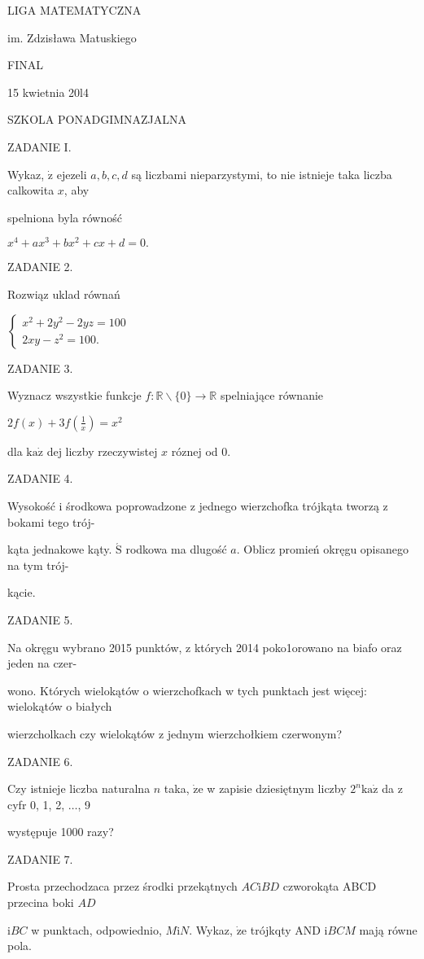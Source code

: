 \documentclass[a4paper,12pt]{article}
\begin{document}
LIGA MATEMATYCZNA

im. Zdzisława Matuskiego

FINAL

15 kwietnia 20l4

SZKOLA PONADGIMNAZJALNA

ZADANIE I.

Wykaz, $\dot{\mathrm{z}}$ ejezeli $a, b, c, d$ są liczbami nieparzystymi, to nie istnieje taka liczba calkowita $x$, aby

spelniona byla równość

$x^{4}+ax^{3}+bx^{2}+cx+d=0.$

ZADANIE 2.

Rozwiąz uklad równań

$\left\{\begin{array}{l}
x^{2}+2y^{2}-2yz=100\\
2xy-z^{2}=100.
\end{array}\right.$

ZADANIE 3.

Wyznacz wszystkie funkcje $f:\mathbb{R}\backslash \{0\}\rightarrow \mathbb{R}$ spelniające równanie

$2f(x)+3f(\displaystyle \frac{1}{x})=x^{2}$

dla $\mathrm{k}\mathrm{a}\dot{\mathrm{z}}$ dej liczby rzeczywistej $x$ róznej od 0.

ZADANIE 4.

Wysokość i środkowa poprowadzone z jednego wierzchofka trójkąta tworzą z bokami tego trój-

kąta jednakowe kąty. $\acute{\mathrm{S}}$ rodkowa ma dlugość $a$. Oblicz promień okręgu opisanego na tym trój-

kącie.

ZADANIE 5.

Na okręgu wybrano 2015 punktów, z których 2014 poko1orowano na biafo oraz jeden na czer-

wono. Których wielokątów o wierzchofkach w tych punktach jest więcej: wielokątów o białych

wierzcholkach czy wielokątów z jednym wierzchołkiem czerwonym?

ZADANIE 6.

Czy istnieje liczba naturalna $n$ taka, $\dot{\mathrm{z}}\mathrm{e}$ w zapisie dziesiętnym liczby $2^{n}\mathrm{k}\mathrm{a}\dot{\mathrm{z}}$ da z cyfr 0, 1, 2, $\ldots$, 9

występuje 1000 razy?

ZADANIE 7.

Prosta przechodzaca przez środki przekątnych $AC\mathrm{i}BD$ czworokąta ABCD przecina boki $AD$

$\mathrm{i}BC$ w punktach, odpowiednio, $M\mathrm{i}N$. Wykaz, $\dot{\mathrm{z}}\mathrm{e}$ trójkqty AND $\mathrm{i}BCM$ mają równe pola.
\end{document}
